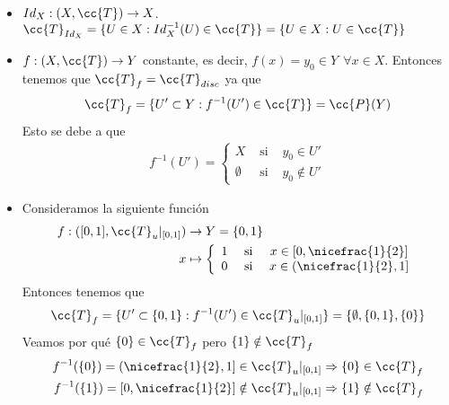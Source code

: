 \begin{ejemplo}\
    \begin{itemize}
        \item $Id_X:(X, \cc{T})\to X$. $\cc{T}_{Id_X}=\{U\in X : Id_X^{-1}(U) \in \cc{T}\}=\{U\in X : U \in \cc{T}\}$
        \item $f:(X, \cc{T})\to Y$ constante, es decir, $f(x)=y_0\in Y\ \ \forall x \in X$. Entonces tenemos que $\cc{T}_f=\cc{T}_{disc}$ ya que
        \begin{align*}
            \cc{T}_f=\{U'\subset Y : f^{-1}(U')\in \cc{T}\}=\cc{P}(Y)
        \end{align*}
        Esto se debe a que
        \begin{align*}
            f^{-1}(U')=\left\{
            \begin{array}{ccc}
                X & \text{ si } & y_0\in U'\\
                \emptyset & \text{ si } & y_0\notin U'
            \end{array}
            \right.
        \end{align*} 
        \item Consideramos la siguiente función
        \begin{align*}
            f:([0,1], \cc{T}_u|_{[0,1]})&\to Y=\{0,1\}\\
            x &\mapsto \left\{
            \begin{array}{ccc}
                1 & \text{ si } & x \in [0,\nicefrac{1}{2}]\\
                0 & \text{ si } & x \in (\nicefrac{1}{2}, 1]
            \end{array}
            \right.
        \end{align*}
        Entonces tenemos que
        \begin{align*}
            \cc{T}_f=\{U'\subset \{0,1\} : f^{-1}(U')\in \cc{T}_u|_{[0,1]}\}=\{\emptyset, \{0,1\}, \{0\}\}
        \end{align*}
        Veamos por qué $\{0\}\in \cc{T}_f$ pero $\{1\}\notin \cc{T}_f$
        \begin{align*}
            f^{-1}(\{0\})=(\nicefrac{1}{2},1] \in \cc{T}_u|_{[0,1]}\Rightarrow \{0\}\in \cc{T}_f\\
            f^{-1}(\{1\})=[0,\nicefrac{1}{2}] \notin \cc{T}_u|_{[0,1]}\Rightarrow \{1\}\notin \cc{T}_f\\
        \end{align*}
    \end{itemize}
    \endsquare
\end{ejemplo}

